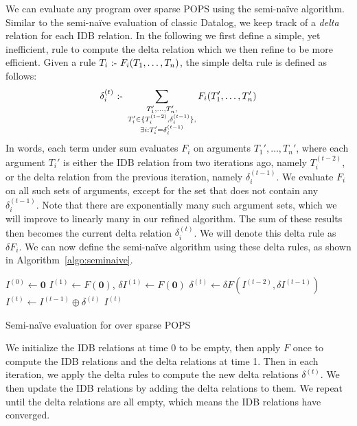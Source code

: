 We can evaluate any \datalogo program over sparse POPS using 
 the semi-na\"ive algorithm. 
Similar to the semi-na\"ive evaluation of classic Datalog, 
 we keep track of a {\em delta} relation for each IDB relation.
In the following we first define a simple, yet inefficient, 
 rule to compute the delta relation
 which we then refine to be more efficient. 
Given a rule $T_i \text{ :- } F_i(T_1, \ldots, T_n)$, 
 the simple delta rule is defined as follows: 
%
$$\delta_i^{(t)} \text{ :- } \sum_{
  \substack{
   T_1', \dots, T_n', \\ 
   T_i' \in \{T_i^{(t-2)}, \delta_i^{(t-1)}\}, \\ 
   \exists i : T_i' = \delta_i^{(t-1)} 
   }}
  F_i(T_1', \ldots, T_n') $$
%
In words, each term under sum evaluates $F_i$ on arguments $T_1', \ldots, T_n'$, 
 where each argument $T_i'$ is either the IDB relation from two iterations ago, 
 namely $T_i^{(t-2)}$, or the delta relation from the previous iteration,
 namely $\delta_i^{(t-1)}$.
We evaluate $F_i$ on all such sets of arguments, 
 except for the set that does not contain any $\delta_i^{(t-1)}$.
Note that there are exponentially many such argument sets, 
 which we will improve to linearly many in our refined algorithm.
The sum of these results then becomes the current delta relation $\delta_i^{(t)}$.
We will denote this delta rule as $\delta F_i$.
We can now define the semi-na\"ive algorithm using these delta rules, 
 as shown in Algorithm~\ref{algo:seminaive}.
%
\begin{algorithm}[t]
  $I^{(0)} \leftarrow \bm 0$\;
  $I^{(1)} \leftarrow F(\bm 0)$, $\delta I^{(1)} \gets F(\bm 0)$ \;
 {
     {$\delta^{(t)} \leftarrow \delta F(I^{(t-2)}, \delta I^{(t-1)})$}\;
     {$I^{(t)} \leftarrow I^{(t-1)} \oplus \delta^{(t)}$}\;
 }
 \Return $I^{(t)}$
 \caption{Semi-na\"ive evaluation for \datalogo over sparse POPS}
 \label{algo:seminaive}
\end{algorithm}
%
We initialize the IDB relations at time $0$ to be empty, 
 then apply $F$ once to compute the IDB relations and the delta relations 
 at time 1.
Then in each iteration, we apply the delta rules to compute the 
 new delta relations $\delta^{(t)}$.
We then update the IDB relations by adding the delta relations to them. 
We repeat until the delta relations are all empty, 
 which means the IDB relations have converged.

